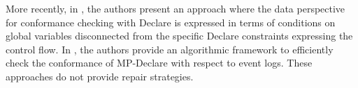 More recently, in \cite{Borrego2014}, the authors present an approach where the data perspective for conformance checking with Declare is expressed in terms of conditions on global variables disconnected from the specific Declare constraints expressing the control flow. In \cite{BurattinMS16}, the authors provide an algorithmic framework to efficiently check the conformance of MP-Declare with respect to event logs. These approaches do not provide repair strategies. 